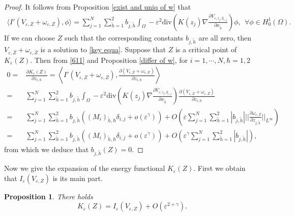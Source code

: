 \documentclass[12pt,reqno]{amsart}
\numberwithin{equation}{section}
\newtheorem{proposition}[theorem]{Proposition}
\theoremstyle{definition}
\theoremstyle{remark}
\begin{document}
\begin{proof}
It follows from Proposition \ref{exist and uniq of w} that
\begin{equation}\label{611}
\begin{split}
\langle I'(V_{\varepsilon,Z}+\omega_{\varepsilon,Z}), \phi\rangle=\sum_{j=1}^N\sum_{\tilde{h}=1}^2b_{j,\tilde{h}}\int_{\Omega} -\varepsilon^2\text{div}\left (K(z_j)\nabla   \frac{\partial V_{\varepsilon, z_j, \hat{q}_{\varepsilon,j}}}{\partial x_{\tilde{h}}}\right )\phi,\ \ \forall \phi\in H^1_0(\Omega).
\end{split}
\end{equation}
If we can choose $ Z $ such that the corresponding constants $ b_{j,\tilde{h}} $  are all zero, then $ V_{\varepsilon,Z}+\omega_{\varepsilon,Z} $  is a solution to \eqref{key equa}.
Suppose that $ Z $ is a critical point of $ K_\varepsilon(Z) $. Then from \eqref{611} and Proposition \ref{differ of w}, for $ i=1,\cdots,N, \hbar=1,2 $
\begin{equation}\label{603}
\begin{split}
0=&\frac{\partial K_\varepsilon(Z)}{\partial z_{i,\hbar}}=\left \langle I'(V_{\varepsilon,Z}+\omega_{\varepsilon,Z}), \frac{\partial (V_{\varepsilon,Z}+\omega_{\varepsilon,Z})}{\partial z_{i,\hbar}}\right \rangle\\
=&\sum_{j=1}^N\sum_{\tilde{h}=1}^2b_{j,\tilde{h}}\int_{\Omega} -\varepsilon^2\text{div}\left (K(z_j)\nabla   \frac{\partial V_{\varepsilon, z_j, \hat{q}_{\varepsilon,j}}}{\partial x_{\tilde{h}}}\right )\frac{\partial (V_{\varepsilon,Z}+\omega_{\varepsilon,Z})}{\partial z_{i,\hbar}}\\
=&\sum_{j=1}^N\sum_{\tilde{h}=1}^2b_{j,\tilde{h}}((M_i)_{\tilde{h},\hbar}\delta_{i,j}+o(\varepsilon^\gamma))+O\left (\varepsilon\sum_{j=1}^N\sum_{\tilde{h}=1}^2|b_{j,\tilde{h}}|\bigg|\bigg|\frac{\partial \omega_{\varepsilon,Z}}{\partial z_{j,\tilde{h}}}\bigg|\bigg|_{L^\infty}\right )\\
=&\sum_{j=1}^N\sum_{\tilde{h}=1}^2b_{j,\tilde{h}}((M_i)_{\tilde{h},\hbar}\delta_{i,j}+o(\varepsilon^\gamma))+O\left (\varepsilon^\gamma\sum_{j=1}^N\sum_{\tilde{h}=1}^2|b_{j,\tilde{h}}|\right ),
\end{split}
\end{equation}
from which we deduce that  $ b_{j,\tilde{h}}(Z)=0. $

\end{proof}


Now we give the  expansion of the energy functional $ K_\varepsilon(Z) $. First we obtain that $I_\varepsilon(V_{\varepsilon,Z})$ is its main part.
\begin{proposition}\label{pro401}
There holds
\begin{equation*}
K_{\varepsilon}(Z)=I_\varepsilon(V_{\varepsilon,Z})+O\left( \varepsilon^{2+\gamma}\right).
\end{equation*}
\end{proposition}
\end{document}

